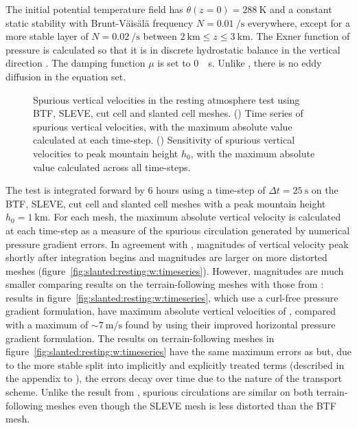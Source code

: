 The initial potential temperature field has $\theta(z = 0) = \SI{288}{\kelvin}$ and a constant static stability with Brunt-V\"ais\"al\"a frequency $N = \SI{0.01}{\per\second}$ everywhere, except for a more stable layer of $N = \SI{0.02}{\per\second}$ between $\SI{2}{\kilo\meter} \leq z \leq \SI{3}{\kilo\meter}$.  The Exner function of pressure is calculated so that it is in discrete hydrostatic balance in the vertical direction \citep{weller-shahrokhi2014}.  The damping function \(\mu\) is set to \SI{0}{\per\second}.  Unlike \citet{klemp2011}, there is no eddy diffusion in the equation set.

\begin{figure}
	\centering
	\begin{subfigure}{\textwidth}
		\centering
		
		\label{fig:slanted:resting:w:timeseries}
		\label{fig:slanted:resting:w:max}
	\end{subfigure}
	\caption{Spurious vertical velocities in the resting atmosphere test using BTF, SLEVE, cut cell and slanted cell meshes.
	() Time series of spurious vertical velocities, with the maximum absolute value calculated at each time-step. 
	() Sensitivity of spurious vertical velocities to peak mountain height $h_0$, with the maximum absolute value calculated across all time-steps.
	}
	\label{fig:slanted:resting:w}
\end{figure}

The test is integrated forward by \num{6} hours using a time-step of $\Delta t = \SI{25}{\second}$ on the BTF, SLEVE, cut cell and slanted cell meshes with a peak mountain height $h_0 = \SI{1}{\kilo\meter}$.
For each mesh, the maximum absolute vertical velocity is calculated at each time-step as a measure of the spurious circulation generated by numerical pressure gradient errors.  In agreement with \citep{klemp2011}, magnitudes of vertical velocity peak shortly after integration begins and magnitudes are larger on more distorted meshes (figure~\ref{fig:slanted:resting:w:timeseries}).
However, magnitudes are much smaller comparing results on the terrain-following meshes with those from \citet{klemp2011}: results in figure~\ref{fig:slanted:resting:w:timeseries}, which use a curl-free pressure gradient formulation, have maximum absolute vertical velocities of \unskip, compared with a maximum of $\sim \SI{7}{\meter\per\second}$ found by \citet{klemp2011} using their improved horizontal pressure gradient formulation.
The results on terrain-following meshes in figure~\ref{fig:slanted:resting:w:timeseries} have the same maximum errors as \citet{weller-shahrokhi2014} but, due to the more stable split into implicitly and explicitly treated terms (described in the appendix to \citet{shaw-weller2016}), the errors decay over time due to the  nature of the transport scheme.
Unlike the result from \citet{klemp2011}, spurious circulations are similar on both terrain-following meshes even though the SLEVE mesh is less distorted than the BTF mesh.


